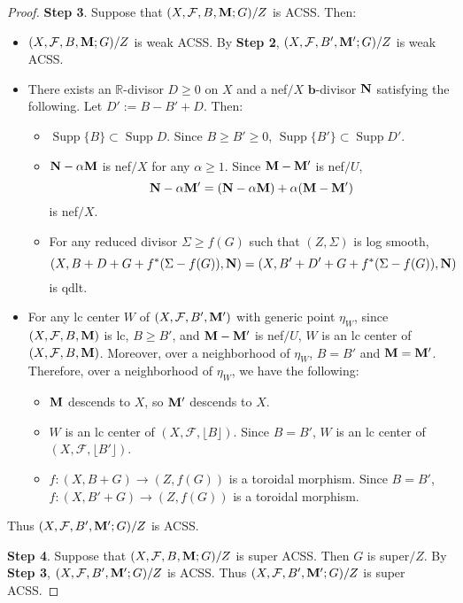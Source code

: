 \documentclass[11pt]{amsart}
\numberwithin{equation}{section}
\newcommand{\bb}{\bm{b}}
\newcommand{\Mm}{{\bf{M}}}
\newcommand{\Nn}{{\bf{N}}}
\newcommand{\Rr}{\mathbb{R}}
\newcommand{\Supp}{\operatorname{Supp}}
\newcommand{\Ff}{\mathcal{F}}
\theoremstyle{definition}
\theoremstyle{definition}
\theoremstyle{definition}
\begin{document}
\begin{proof}
\medskip

\noindent\textbf{Step 3}.  Suppose that $(X,\Ff,B,\Mm;G)/Z$ is ACSS. Then:
\begin{itemize}
\item $(X,\Ff,B,\Mm;G)/Z$ is weak ACSS. By \textbf{Step 2}, $(X,\Ff,B',\Mm';G)/Z$ is weak ACSS.
\item There exists an $\Rr$-divisor $D\geq 0$ on $X$ and a nef$/X$ $\bb$-divisor $\Nn$ satisfying the following. Let $D':=B-B'+D$. Then:
\begin{itemize}
    \item $\Supp\{B\}\subset\Supp D$.  Since $B\geq B'\geq 0$, $\Supp\{B'\}\subset\Supp D'$.
    \item $\Nn-\alpha\Mm$ is nef$/X$ for any $\alpha\geq 1$. Since $\Mm-\Mm'$ is nef$/U$, 
    $$\Nn-\alpha\Mm'=(\Nn-\alpha\Mm)+\alpha(\Mm-\Mm')$$
    is nef$/X$.
    \item For any reduced divisor $\Sigma\geq f(G)$ such that $(Z,\Sigma)$ is log smooth,
    $$(X,B+D+G+f^*(\Sigma-f(G)),\Nn)=(X,B'+D'+G+f^*(\Sigma-f(G)),\Nn)$$
    is qdlt.
\end{itemize}
\item For any lc center $W$ of $(X,\Ff,B',\Mm')$ with generic point $\eta_W$, since $(X,\Ff,B,\Mm)$ is lc, $B\geq B'$, and $\Mm-\Mm'$ is nef$/U$, $W$ is an lc center of $(X,\Ff,B,\Mm)$. Moreover,  over a neighborhood of $\eta_W$, $B=B'$ and $\Mm=\Mm'$. Therefore, over a neighborhood of $\eta_W$, we have the following:
\begin{itemize}
\item $\Mm$ descends to $X$, so $\Mm'$ descends to $X$.
\item $W$ is an lc center of $(X,\Ff,\lfloor B\rfloor)$. Since $B=B'$, $W$ is an lc center of $(X,\Ff,\lfloor B'\rfloor)$.
\item $f: (X,B+G)\rightarrow (Z,f(G))$ is a toroidal morphism.  Since $B=B'$, $f: (X,B'+G)\rightarrow (Z,f(G))$ is a toroidal morphism. 
\end{itemize}
\end{itemize}
Thus $(X,\Ff,B',\Mm';G)/Z$ is ACSS.

\medskip

\noindent\textbf{Step 4}. Suppose that $(X,\Ff,B,\Mm;G)/Z$ is super ACSS. Then $G$ is super$/Z$. By \textbf{Step 3}, $(X,\Ff,B',\Mm';G)/Z$ is ACSS. Thus $(X,\Ff,B',\Mm';G)/Z$ is super ACSS.
\end{proof}
\end{document}
